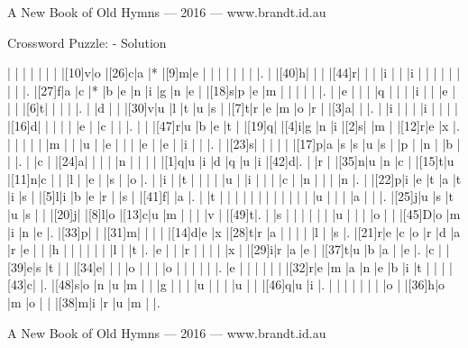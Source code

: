 \documentclass[12pt]{article}
\begin{document}
\centerline{A New Book of Old Hymns --- 2016 --- www.brandt.id.au}
\eject
\begin{center}
  \huge{Crossword Puzzle: - Solution}
\end{center}
\vspace{1.5cm}
\PuzzleSolution
\begin{Puzzle}{22}{24}
  |{}  |{}  |{}  |{}  |{}  |{}  |{}  |[10]v|o   |[26]c|a   |*   |[9]m|e   |{}  |{}  |{}  |{}  |{}  |{}  |{}  |.
  |{}  |[40]h|{}  |{}  |{}  |[44]r|{}  |{}  |{}  |i   |{}  |{}  |i   |{}  |{}  |{}  |{}  |{}  |{}  |{}  |{}  |.
  |[27]f|a   |c   |*   |b   |e   |n   |i   |g   |n   |e   |{}  |[18]s|p   |e   |m   |{}  |{}  |{}  |{}  |{}  |.
  |{}  |e   |{}  |{}  |{}  |q   |{}  |{}  |{}  |i   |{}  |{}  |e   |{}  |{}  |{}  |[6]t|{}  |{}  |{}  |{}  |.
  |{}  |d   |{}  |{}  |[30]v|u   |l   |t   |u   |s   |{}  |[7]t|r   |e   |m   |o   |r   |{}  |[3]a|{}  |{}  |.
  |{}  |i   |{}  |{}  |{}  |i   |{}  |{}  |{}  |{}  |[16]d|{}  |{}  |{}  |{}  |{}  |e   |{}  |c   |{}  |{}  |.
  |{}  |{}  |[47]r|u   |b   |e   |t   |{}  |[19]q|{}  |[4]i|g   |n   |i   |[2]s|{}  |m   |{}  |[12]r|e   |x   |.
  |{}  |{}  |{}  |{}  |{}  |m   |{}  |{}  |u   |{}  |e   |{}  |{}  |{}  |e   |{}  |e   |{}  |i   |{}  |{}  |.
  |{}  |[23]s|{}  |{}  |{}  |{}  |{}  |[17]p|a   |s   |s   |u   |s   |{}  |p   |{}  |n   |{}  |b   |{}  |{}  |.
  |{}  |c   |{}  |[24]a|{}  |{}  |{}  |{}  |n   |{}  |{}  |{}  |{}  |[1]q|u   |i   |d   |q   |u   |i   |[42]d|.
  |{}  |r   |{}  |[35]n|u   |n   |c   |{}  |[15]t|u   |[11]n|c   |{}  |{}  |l   |{}  |e   |{}  |s   |{}  |o   |.
  |{}  |i   |{}  |t   |{}  |{}  |{}  |{}  |u   |{}  |i   |{}  |{}  |{}  |c   |{}  |n   |{}  |{}  |{}  |n   |.
  |{}  |[22]p|i   |e   |t   |a   |t   |i   |s   |{}  |[5]l|i   |b   |e   |r   |{}  |s   |{}  |[41]f|{}  |a   |.
  |{}  |t   |{}  |{}  |{}  |{}  |{}  |{}  |{}  |{}  |{}  |{}  |{}  |{}  |u   |{}  |{}  |{}  |a   |{}  |{}  |.
  |[25]j|u   |s   |t   |u   |s   |{}  |{}  |[20]j|{}  |[8]l|o   |[13]c|u   |m   |{}  |{}  |{}  |v   |{}  |[49]t|.
  |{}  |s   |{}  |{}  |{}  |{}  |{}  |{}  |u   |{}  |{}  |{}  |o   |{}  |{}  |[45]D|o   |m   |i   |n   |e   |.
  |[33]p|{}  |{}  |[31]m|{}  |{}  |{}  |{}  |[14]d|e   |x   |[28]t|r   |a   |{}  |{}  |{}  |{}  |l   |{}  |s   |.
  |[21]r|e   |c   |o   |r   |d   |a   |r   |e   |{}  |{}  |h   |{}  |{}  |{}  |{}  |{}  |{}  |l   |{}  |t   |.
  |e   |{}  |{}  |r   |{}  |{}  |{}  |{}  |x   |{}  |[29]i|r   |a   |e   |{}  |[37]t|u   |b   |a   |{}  |e   |.
  |c   |{}  |[39]e|s   |t   |{}  |{}  |[34]e|{}  |{}  |{}  |o   |{}  |{}  |{}  |o   |{}  |{}  |{}  |{}  |{}  |.
  |e   |{}  |{}  |{}  |{}  |{}  |{}  |[32]r|e   |m   |a   |n   |e   |b   |i   |t   |{}  |{}  |{}  |[43]c|{}  |.
  |[48]s|o   |n   |u   |m   |{}  |{}  |g   |{}  |{}  |{}  |u   |{}  |{}  |{}  |u   |{}  |{}  |[46]q|u   |i   |.
  |{}  |{}  |{}  |{}  |{}  |{}  |{}  |o   |{}  |[36]h|o   |m   |o   |{}  |{}  |[38]m|i   |r   |u   |m   |{}  |.
\end{Puzzle}
\bigskip

\vfill

\centerline{A New Book of Old Hymns --- 2016 --- www.brandt.id.au}
\eject
\end{document}
